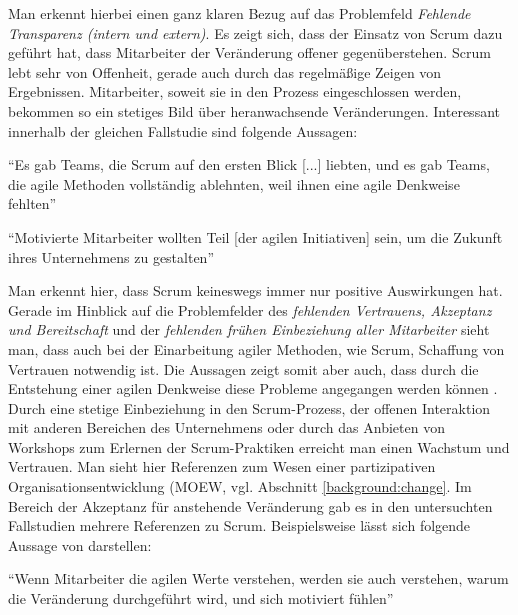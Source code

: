 Man erkennt hierbei einen ganz klaren Bezug auf das Problemfeld \textit{Fehlende Transparenz (intern und extern)}. Es zeigt sich, dass der Einsatz von Scrum dazu geführt hat, dass Mitarbeiter der Veränderung offener gegenüberstehen. Scrum lebt sehr von Offenheit, gerade auch durch das regelmäßige Zeigen von Ergebnissen. Mitarbeiter, soweit sie in den Prozess eingeschlossen werden, bekommen so ein stetiges Bild über heranwachsende Veränderungen. Interessant innerhalb der gleichen Fallstudie sind folgende Aussagen:


\begin{center}
	``Es gab Teams, die Scrum auf den ersten Blick [...] liebten, und es gab Teams, die agile Methoden vollständig ablehnten, weil ihnen eine agile Denkweise fehlten'' \cite[S. 5]{fuchs_adapting_2019}
\end{center}

\begin{center}
	 ``Motivierte Mitarbeiter wollten Teil [der agilen Initiativen] sein, um die Zukunft ihres Unternehmens zu gestalten'' \cite[S. 7]{fuchs_adapting_2019}
\end{center}


Man erkennt hier, dass Scrum keineswegs immer nur positive Auswirkungen hat. Gerade im Hinblick auf die Problemfelder des \textit{fehlenden Vertrauens, Akzeptanz und Bereitschaft} und der \textit{fehlenden frühen Einbeziehung aller Mitarbeiter} sieht man, dass auch bei der  Einarbeitung agiler Methoden, wie Scrum, Schaffung von Vertrauen notwendig ist. Die Aussagen zeigt somit aber auch, dass durch die Entstehung einer agilen Denkweise diese Probleme angegangen werden können \cite{hofert_agile_2018}. Durch eine stetige Einbeziehung in den Scrum-Prozess, der offenen Interaktion mit anderen Bereichen des Unternehmens oder durch das Anbieten von Workshops zum Erlernen der Scrum-Praktiken erreicht man einen Wachstum und Vertrauen. Man sieht hier Referenzen zum Wesen einer partizipativen Organisationsentwicklung (MOEW, vgl. Abschnitt \ref{background:change}. Im Bereich der Akzeptanz für anstehende Veränderung gab es in den untersuchten Fallstudien mehrere Referenzen zu Scrum. Beispielsweise lässt sich folgende Aussage von  darstellen:

\begin{center}
	``Wenn Mitarbeiter die agilen Werte verstehen, werden sie auch verstehen, warum die Veränderung durchgeführt wird, und sich motiviert fühlen'' \cite[S. 17]{dikert_challenges_2016}
\end{center}

